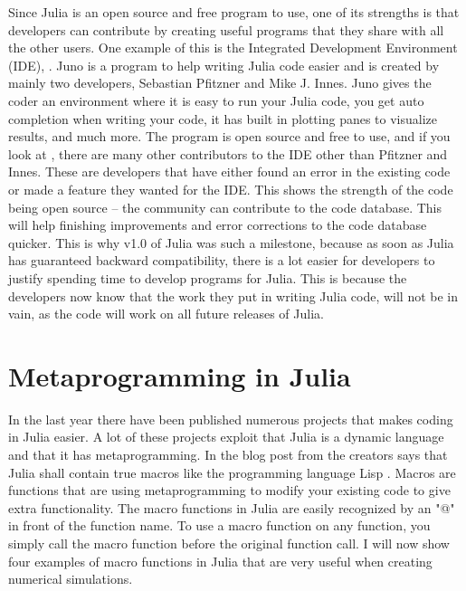 Since Julia is an open source and free program to use, one of its strengths is that developers can contribute by creating useful programs that they share with all the other users. One example of this is the Integrated Development Environment (IDE), \cite{JunoIDE}. Juno is a program to help writing Julia code easier and is created by mainly two developers, Sebastian Pfitzner and Mike J. Innes. Juno gives the coder an environment where it is easy to run your Julia code, you get auto completion when writing your code, it has built in plotting panes to visualize results, and much more. The program is open source and free to use, and if you look at \cite{JunoGithub}, there are many other contributors to the IDE other than Pfitzner and Innes. These are developers that have either found an error in the existing code or made a feature they wanted for the IDE. This shows the strength of the code being open source -- the community can contribute to the code database. This will help finishing improvements and error corrections to the code database quicker. This is why v1.0 of Julia was such a milestone, because as soon as Julia has guaranteed backward compatibility, there is a lot easier for developers to justify spending time to develop programs for Julia. This is because the developers now know that the work they put in writing Julia code, will not be in vain, as the code will work on all future releases of Julia. 

\section{Metaprogramming in Julia}
\label{sec:Metaprogramming}
In the last year there have been published numerous projects that makes coding in Julia easier. A lot of these projects exploit that Julia is a dynamic language and that it has metaprogramming. In the blog post from \cite{juliaBlogRelease2012} the creators says that Julia shall contain true macros like the programming language Lisp \emph{\citep{Lisp}}. Macros are functions that are using metaprogramming to modify your existing code to give extra functionality. The macro functions in Julia are easily recognized by an "@" in front of the function name. To use a macro function on any function, you simply call the macro function before the original function call. I will now show four examples of macro functions in Julia that are very useful when creating numerical simulations.
